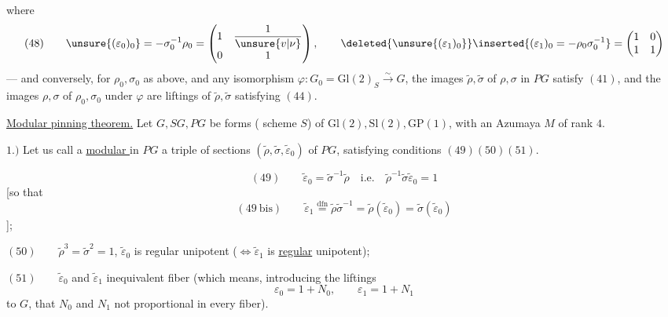 
where 
\[
(48)\qquad
\unsure{(\varepsilon_0)_0}=-\sigma_0^{-1}\rho_0=
\begin{pmatrix}1&\dfrac{1}{\unsure{v|\nu}}\\0&1\end{pmatrix},\qquad
\deleted{\unsure{(\varepsilon_1)_0}}
\inserted{(\varepsilon_1)_0=-\rho_0\sigma_0^{-1}}=
\begin{pmatrix}1&0\\1&1\end{pmatrix}
\]
--- and conversely, for $\rho_0,\sigma_0$ as above, and any isomorphism
$\varphi:G_0=\mathrm{Gl}(2)_S\xrightarrow{\sim}G$, the images
$\widetilde\rho,\widetilde\sigma$ of $\rho,\sigma$ in $PG$ satisfy
$(41)$, and the images $\rho,\sigma$ of $\rho_0,\sigma_0$ under $\varphi$
are liftings of $\widetilde\rho,\widetilde\sigma$ satisfying $(44)$.

\uline{Modular pinning theorem.} Let $G,SG,PG$ be forms
( scheme $S$) of $\mathrm{Gl}(2),\mathrm{Sl}(2),\mathrm{GP}(1)$,
 with an Azumaya  $M$ of rank $4$.

$1.)$ Let us call a \uline{modular }
in $PG$ a triple of sections $(\widetilde\rho,\widetilde\sigma,
\widetilde\varepsilon_0)$ of $PG$, satisfying conditions $(49)(50)(51)$.


\[
(49)\qquad \widetilde\varepsilon_0=\widetilde\sigma^{-1}\widetilde\rho
\quad\text{i.e.}\quad
\widetilde\rho^{-1}\widetilde\sigma\widetilde\varepsilon_0=1
\]
[so that
\[
(49\ \mathrm{bis})\qquad
\widetilde\varepsilon_1\overset{\mathrm{dfn}}=
\widetilde\rho\widetilde\sigma^{-1}=
\widetilde\rho(\widetilde\varepsilon_0)=
\widetilde\sigma(\widetilde\varepsilon_0)
\]
];

$(50)\qquad \widetilde\rho^3=\widetilde\sigma^2=1$,\quad
$\widetilde\varepsilon_0$ is regular unipotent
($\Longleftrightarrow\widetilde\varepsilon_1$ is \uline{regular} unipotent);

$(51)\qquad \widetilde\varepsilon_0$ and $\widetilde\varepsilon_1$
 inequivalent 
 fiber
(which means, introducing the liftings
\[
\varepsilon_0=1+N_0,\qquad \varepsilon_1=1+N_1
\]
to $G$, that $N_0$ and $N_1$ not proportional in every fiber).

